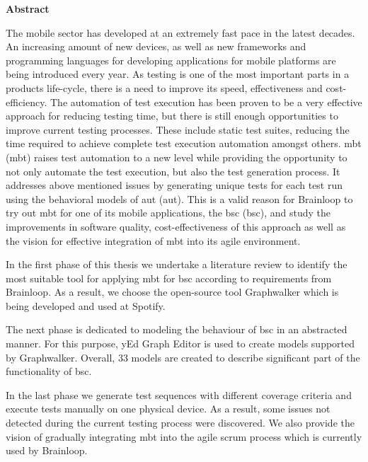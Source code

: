 \newpage
{}
\thispagestyle{empty}
\hoffset=0mm
\begin{center}
    {\Large \bf Abstract}
\end{center}
\begin{spacing}{1.35}

\par
The mobile sector has developed at an extremely fast pace in the latest decades. An increasing amount of new devices, as well as new frameworks and programming languages for developing applications for mobile platforms are being introduced every year. As testing is one of the most important parts in a products life-cycle, there is a need to improve its speed, effectiveness and cost-efficiency. The automation of test execution has been proven to be a very effective approach for reducing testing time, but there is still enough opportunities to improve current testing processes. These include static test suites, reducing the time required to achieve complete test execution automation amongst others. \acrlong{mbt} (\acrshort{mbt}) raises test automation to a new level while providing the opportunity to not only automate the test execution, but also the test generation process. It addresses above mentioned issues by generating unique tests for each test run using the behavioral models of \acrlong{aut} (\acrshort{aut}). This is a valid reason for Brainloop to try out \acrshort{mbt} for one of its mobile applications, the \acrlong{bsc} (\acrshort{bsc}), and study the improvements in software quality, cost-effectiveness of this approach as well as the vision for effective integration of \acrshort{mbt} into its agile environment.

\par
In the first phase of this thesis we undertake a literature review to identify the most suitable tool for applying \acrshort{mbt} for \acrshort{bsc} according to requirements from Brainloop. As a result, we choose the open-source tool Graphwalker which is being developed and used at Spotify.

\par
The next phase is dedicated to modeling the behaviour of \acrshort{bsc} in an abstracted manner. For this purpose, yEd Graph Editor is used to create models supported by Graphwalker. Overall, 33 models are created to describe significant part of the functionality of \acrshort{bsc}.

\par
In the last phase we generate test sequences with different coverage criteria and execute tests manually on one physical device. As a result, some issues not detected during the current testing process were discovered. We also provide the vision of gradually integrating \acrshort{mbt} into the agile scrum process which is currently used by Brainloop.

\end{spacing}
